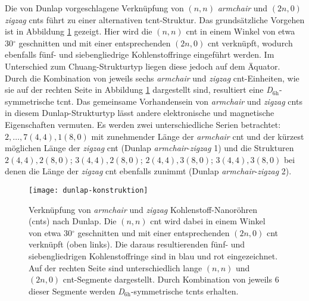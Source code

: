 Die von Dunlap vorgeschlagene Verknüpfung von $(n,n)$ \textit{armchair} und $(2n,0)$ \textit{zigzag} \acp{cnt} führt zu einer alternativen \ac{tcnt}-Struktur. Das grundsätzliche Vorgehen ist in Abbildung \ref{abb:dunlap-konstruktion} gezeigt. Hier wird die $(n,n)$ \ac{cnt} in einem Winkel von etwa 30$^\circ$ geschnitten und mit einer entsprechenden $(2n,0)$ \ac{cnt} verknüpft, wodurch ebenfalls fünf- und siebengliedrige Kohlenstoffringe eingeführt werden. Im Unterschied zum \glqq Chuang-Strukturtyp\grqq{} liegen diese jedoch auf dem Äquator. Durch die Kombination von jeweils sechs \textit{armchair} und \textit{zigzag} \ac{cnt}-Einheiten, wie sie auf der rechten Seite in Abbildung \ref{abb:dunlap-konstruktion} dargestellt sind, resultiert eine \textit{D}$_{6\text{h}}$-symmetrische \ac{tcnt}. Das gemeinsame Vorhandensein von \textit{armchair} und \textit{zigzag} \acp{cnt} in diesem \glqq Dunlap-Strukturtyp\grqq{} lässt andere elektronische und magnetische Eigenschaften vermuten. Es werden zwei unterschiedliche Serien betrachtet: $2,\dots,7(4,4),1(8,0)$ mit zunehmender Länge der \textit{armchair} \ac{cnt} und der kürzest möglichen Länge der \textit{zigzag} \ac{cnt} (\glqq Dunlap \textit{armchair}-\textit{zigzag} 1\grqq{}) und die Strukturen $2(4,4),2(8,0)$; $3(4,4),2(8,0)$; $2(4,4),3(8,0)$; $3(4,4),3(8,0)$ bei denen die Länge der \textit{zigzag} \ac{cnt} ebenfalls zunimmt (\glqq Dunlap \textit{armchair}-\textit{zigzag} 2\grqq{}).
\begin{figure}[ht!]
	\centering
	\texttt{[image: dunlap-konstruktion]}
	\captionsetup{figurewithin = chapter}
	\captionsetup{font=small, labelfont=bf}\caption[Verknüpfung von $(n,n)$ \textit{armchair} und $(2n,0)$ \textit{zigzag} \acp{cnt}]{Verknüpfung von \textit{armchair} und \textit{zigzag} Kohlenstoff-Nanoröhren (\acp{cnt}) nach Dunlap\supercite{dunlap1992connecting}. Die $(n,n)$ \ac{cnt} wird dabei in einem Winkel von etwa 30$^\circ$ geschnitten und mit einer entsprechenden $(2n,0)$ \ac{cnt} verknüpft (oben links). Die daraus resultierenden fünf- und siebengliedrigen Kohlenstoffringe sind in blau und rot eingezeichnet. Auf der rechten Seite sind unterschiedlich lange $(n,n)$ und $(2n,0)$ \ac{cnt}-Segmente dargestellt. Durch Kombination von jeweils 6 dieser Segmente werden \textit{D}$_{6\text{h}}$-symmetrische \acp{tcnt} erhalten.}
\label{abb:dunlap-konstruktion}
\end{figure}
\FloatBarrier

